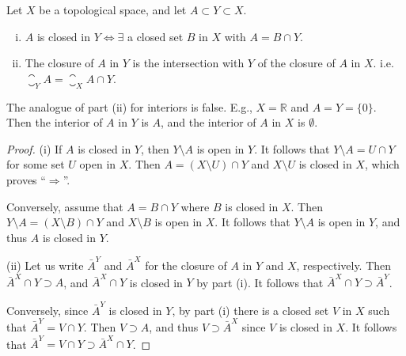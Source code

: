 \documentclass[a4paper,11pt]{article}
\begin{document}
\begin{proposition}\label{prop:4.6}
    Let $X$ be a topological space, and let $A \subset Y \subset X$.

    \begin{enumerate}[(i)]
        \item $A$ is closed in $Y \Longleftrightarrow \exists$ a closed set $B$ in $X$ with $A=B \cap Y$.

        \item The closure of $A$ in $Y$ is the intersection with $Y$ of the closure of $A$ in $X$. i.e. $ \closure_Y A = \closure_X A \cap Y $.
    \end{enumerate}
\end{proposition}

\begin{remark}
    The analogue of part (ii) for interiors is false. E.g., $X=\mathbb{R}$ and $A=Y=\{0\}$. Then the interior of $A$ in $Y$ is $A$, and the interior of $A$ in $X$ is $\emptyset$.
\end{remark}

\begin{proof}
    (i) If $A$ is closed in $Y$, then $Y \setminus A$ is open in $Y$. It follows that $Y \setminus A=U \cap Y$ for some set $U$ open in $X$. Then $A=(X \setminus U) \cap Y$ and $X \setminus U$ is closed in $X$, which proves ``$\Longrightarrow $''.

Conversely, assume that $A=B \cap Y$ where $B$ is closed in $X$. Then $Y \setminus A=(X \setminus B) \cap Y$ and $X \setminus B$ is open in $X$. It follows that $Y \setminus A$ is open in $Y$, and thus $A$ is closed in $Y$.

(ii) Let us write $\bar{A}^{Y}$ and $\bar{A}^{X}$ for the closure of $A$ in $Y$ and $X$, respectively. Then $\bar{A}^{X} \cap Y \supset A$, and $\bar{A}^{X} \cap Y$ is closed in $Y$ by part (i). It follows that $\bar{A}^{X} \cap Y \supset \bar{A}^{Y}$.

Conversely, since $\bar{A}^{Y}$ is closed in $Y$, by part (i) there is a closed set $V$ in $X$ such that $\bar{A}^{Y}=V \cap Y$. Then $V \supset A$, and thus $V \supset \bar{A}^{X}$ since $V$ is closed in $X$. It follows that $\bar{A}^{Y}=V \cap Y \supset \bar{A}^{X} \cap Y$.
\end{proof}
\end{document}
